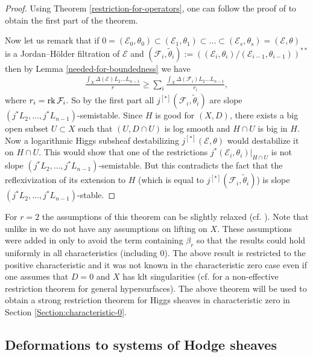 \documentclass[12pt]{article}
\theoremstyle{plain}
\theoremstyle{definition}
\theoremstyle{remark}
\newcommand{\cE}{{\mathcal E}}
\newcommand{\cF}{{\mathcal F}}
\newcommand{\rk}{{\mathop{\rm rk \,}}}
\begin{document}
\begin{proof}
Using Theorem \ref{restriction-for-operators}, one can follow the proof of
\cite[Theorem 10]{La3} to obtain the first part of the theorem.

Now let us remark that if  $0= (\cE_0, \theta_0)\subset (\cE_1, \theta_1)\subset ...\subset (\cE_s, \theta_s)=(\cE , \theta )$ is a  Jordan--H\"older filtration of $\cE$ and $(\cF_i, \tilde \theta_{i}):=((\cE_i, \theta_i)/(\cE_{i-1}, \theta_{i-1}))^{**}$ then by Lemma \ref{needed-for-boundedness} we have 
\begin{align*}
		\frac{\int _X \Delta  (\cE)L_2...L_{n-1}}{r}\ge \sum _i \frac{\int _X \Delta  (\cF_i)L_2...L_{n-1}}{r_i},
\end{align*}
where $r_i=\rk \cF_i$. So by the first part all $j^{[*]}(\cF_i, \tilde \theta_{i})$ are slope $(j^*L_2,\dots ,j^*L_{n-1})$-semistable. Since $H$ is good for $(X,D)$, there exists a big open subset $U\subset X$ such that $(U, D\cap U)$ is log smooth and $H\cap U$ is big in $H$.  Now a logarithmic Higgs subsheaf destabilizing
$j^{[*]}(\cE , \theta )$ would destabilize it on $H\cap U$. This would show that one of the restrictions
$j^*(\cE_i, \theta_i)|_{H\cap U}$ is not slope $(j^*L_2,\dots ,j^*L_{n-1})$-semistable. But this contradicts the fact that the reflexivization of its extension to $H$ (which is equal to $j^{[*]}(\cF_i, \tilde \theta_{i})$)
is slope $(j^*L_2,\dots ,j^*L_{n-1})$-stable.
\end{proof}



\medskip

For $r=2$ the assumptions of this theorem can be slightly relaxed (cf. \cite[Theorem 10]{La3}).
Note that unlike in \cite{La3} we do not have any assumptions on lifting on $X$. These assumptions were added in \cite{La3} only to avoid the term containing $\beta _r$ so that the results could hold uniformly in all characteristics (including $0$). The above result is restricted to the positive characteristic and
it was not known in the characteristic zero case even if one assumes that $D=0$ and $X$ has klt singularities (cf. \cite[Theorem 5.22]{GKPT2} for a non-effective restriction theorem for general hypersurfaces).  The above theorem will be used to obtain a strong restriction theorem for Higgs sheaves in characteristic zero in Section \ref{Section:characteristic-0}.



\subsection{Deformations to systems of Hodge sheaves}
\end{document}
